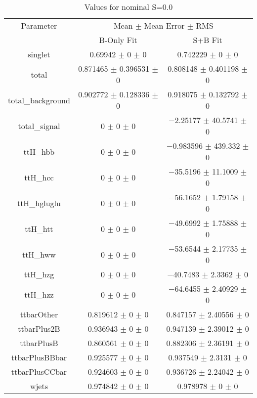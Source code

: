 \begin{table}
\centering
\caption{Values for nominal S=0.0}
\begin{tabular}{ccc}
\toprule
Parameter & \multicolumn{2}{c}{Mean $\pm$ Mean Error $\pm$ RMS}\\
 & B-Only Fit & S+B Fit\\
\midrule
singlet & \num{0.69942} $\pm$ \num{0} $\pm$ \num{0} & \num{0.742229} $\pm$ \num{0} $\pm$ \num{0}\\
total & \num{0.871465} $\pm$ \num{0.396531} $\pm$ \num{0} & \num{0.808148} $\pm$ \num{0.401198} $\pm$ \num{0}\\
total\_background & \num{0.902772} $\pm$ \num{0.128336} $\pm$ \num{0} & \num{0.918075} $\pm$ \num{0.132792} $\pm$ \num{0}\\
total\_signal & \num{0} $\pm$ \num{0} $\pm$ \num{0} & \num{-2.25177} $\pm$ \num{40.5741} $\pm$ \num{0}\\
ttH\_hbb & \num{0} $\pm$ \num{0} $\pm$ \num{0} & \num{-0.983596} $\pm$ \num{439.332} $\pm$ \num{0}\\
ttH\_hcc & \num{0} $\pm$ \num{0} $\pm$ \num{0} & \num{-35.5196} $\pm$ \num{11.1009} $\pm$ \num{0}\\
ttH\_hgluglu & \num{0} $\pm$ \num{0} $\pm$ \num{0} & \num{-56.1652} $\pm$ \num{1.79158} $\pm$ \num{0}\\
ttH\_htt & \num{0} $\pm$ \num{0} $\pm$ \num{0} & \num{-49.6992} $\pm$ \num{1.75888} $\pm$ \num{0}\\
ttH\_hww & \num{0} $\pm$ \num{0} $\pm$ \num{0} & \num{-53.6544} $\pm$ \num{2.17735} $\pm$ \num{0}\\
ttH\_hzg & \num{0} $\pm$ \num{0} $\pm$ \num{0} & \num{-40.7483} $\pm$ \num{2.3362} $\pm$ \num{0}\\
ttH\_hzz & \num{0} $\pm$ \num{0} $\pm$ \num{0} & \num{-64.6455} $\pm$ \num{2.40929} $\pm$ \num{0}\\
ttbarOther & \num{0.819612} $\pm$ \num{0} $\pm$ \num{0} & \num{0.847157} $\pm$ \num{2.40556} $\pm$ \num{0}\\
ttbarPlus2B & \num{0.936943} $\pm$ \num{0} $\pm$ \num{0} & \num{0.947139} $\pm$ \num{2.39012} $\pm$ \num{0}\\
ttbarPlusB & \num{0.860561} $\pm$ \num{0} $\pm$ \num{0} & \num{0.882306} $\pm$ \num{2.36191} $\pm$ \num{0}\\
ttbarPlusBBbar & \num{0.925577} $\pm$ \num{0} $\pm$ \num{0} & \num{0.937549} $\pm$ \num{2.3131} $\pm$ \num{0}\\
ttbarPlusCCbar & \num{0.924603} $\pm$ \num{0} $\pm$ \num{0} & \num{0.936726} $\pm$ \num{2.24042} $\pm$ \num{0}\\
wjets & \num{0.974842} $\pm$ \num{0} $\pm$ \num{0} & \num{0.978978} $\pm$ \num{0} $\pm$ \num{0}\\
\bottomrule
\end{tabular}
\end{table}